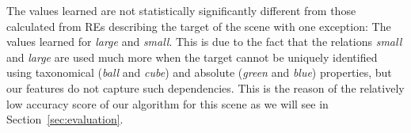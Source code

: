 The values learned are not statistically significantly different from those  calculated from REs describing the target of the scene with one exception: The values learned for \emph{large} and \emph{small}. This is due to the fact that the relations \emph{small} and \emph{large} are used much more when the target cannot be uniquely identified using taxonomical (\emph{ball} and \emph{cube}) and absolute (\emph{green} and \emph{blue}) properties, but our features do not capture such dependencies. This is the reason of the relatively low accuracy score of our algorithm for this scene as we will see in Section~\ref{sec:evaluation}. 
%

